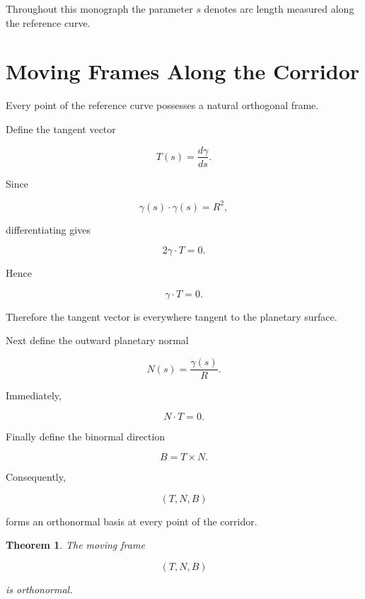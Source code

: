 \documentclass[11pt,fleqn]{book}
\numberwithin{equation}{chapter}
\theoremstyle{plain}
\newtheorem{theorem}{Theorem}[chapter]
\theoremstyle{definition}
\theoremstyle{remark}
\begin{document}
Throughout this monograph the parameter $s$ denotes arc length measured
along the reference curve.


\section{Moving Frames Along the Corridor}

Every point of the reference curve possesses a natural orthogonal frame.

Define the tangent vector

\[
T(s)
=
\frac{d\gamma}{ds}.
\]

Since

\[
\gamma(s)\cdot\gamma(s)=R^2,
\]

differentiating gives

\[
2\gamma\cdot T=0.
\]

Hence

\[
\gamma\cdot T=0.
\]

Therefore the tangent vector is everywhere tangent to the planetary
surface.

Next define the outward planetary normal

\[
N(s)
=
\frac{\gamma(s)}{R}.
\]

Immediately,

\[
N\cdot T=0.
\]

Finally define the binormal direction

\[
B=T\times N.
\]

Consequently,

\[
(T,N,B)
\]

forms an orthonormal basis at every point of the corridor.


\begin{theorem}

The moving frame

\[
(T,N,B)
\]

is orthonormal.

\end{theorem}
\end{document}
